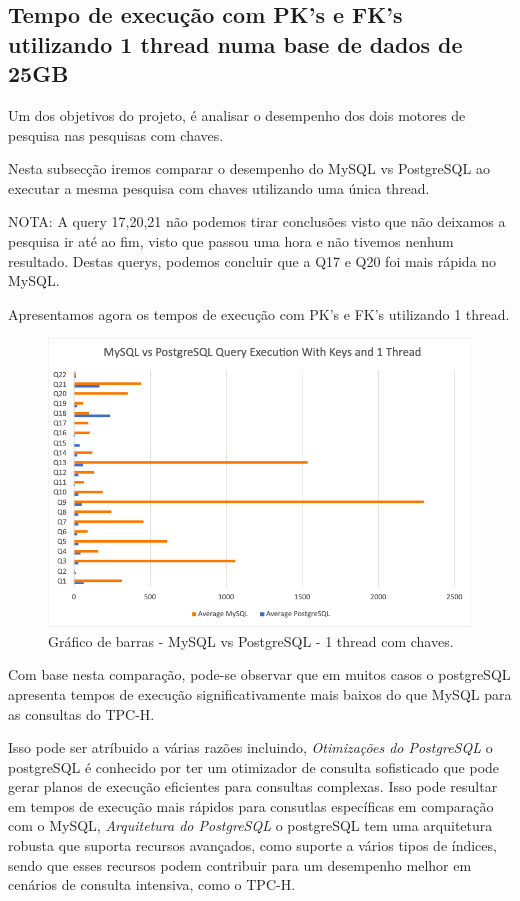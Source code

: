 \documentclass{article}
\begin{document}
\clearpage
\subsection{Tempo de execução com PK's e FK's utilizando 1 thread numa base
de dados de 25GB}
\texttt{}\par Um dos objetivos do projeto, é analisar o desempenho dos dois motores de pesquisa nas pesquisas com chaves.

Nesta subsecção iremos comparar o desempenho do MySQL vs PostgreSQL ao executar a mesma pesquisa com chaves utilizando uma única thread.


NOTA: A query 17,20,21 não podemos tirar conclusões visto que não deixamos a pesquisa ir até ao fim, visto que passou uma hora e não tivemos nenhum resultado. Destas querys, podemos concluir que a Q17 e Q20 foi mais rápida no MySQL.


Apresentamos agora os tempos de execução com PK's e FK's utilizando 1 thread.
\begin{figure}[H]
  \centering
  \includegraphics[width=\textwidth]{Graphs/mysqlvspostgresql_withkeys_onethread.png}
  \caption{Gráfico de barras - MySQL vs PostgreSQL - 1 thread com chaves.}
  \label{fig:PKCreation2}
\end{figure}
\texttt{}\par Com base nesta comparação, pode-se observar que em muitos casos o postgreSQL apresenta tempos de execução significativamente mais baixos do que MySQL para as consultas do TPC-H.

Isso pode ser atríbuido a várias razões incluindo, \textit{Otimizações do PostgreSQL} o postgreSQL é conhecido por ter um otimizador de consulta sofisticado que pode gerar planos de execução eficientes para consultas complexas. Isso pode resultar em tempos de execução mais rápidos para consutlas específicas em comparação com o MySQL, \textit{Arquitetura do PostgreSQL} o postgreSQL tem uma arquitetura robusta que suporta recursos avançados, como suporte a vários tipos de índices, sendo que esses recursos podem contribuir para um desempenho melhor em cenários de consulta intensiva, como o TPC-H.
\end{document}
